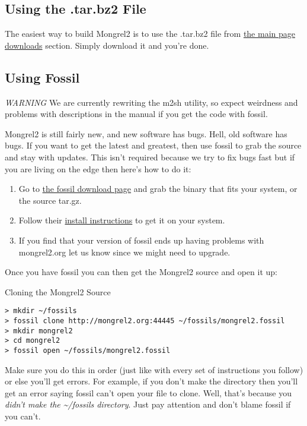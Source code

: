 \subsection{Using the .tar.bz2 File}

The easiest way to build Mongrel2 is to use the .tar.bz2 file from 
\href{http://mongrel2.org/home#download}{the main page downloads} section.
Simply download it and you're done.


\subsection{Using Fossil}

\emph{WARNING} We are currently rewriting the m2sh utility, so expect weirdness
and problems with descriptions in the manual if you get the code with fossil.

Mongrel2 is still fairly new, and new software has bugs.  Hell, old software has bugs.
If you want to get the latest and greatest, then use fossil to grab the source and stay
with updates.  This isn't required because we try to fix bugs fast but if you are
living on the edge then here's how to do it:

\begin{enumerate}
\item Go to \href{http://www.fossil-scm.org/download.html}{the fossil download page} and
    grab the binary that fits your system, or the source tar.gz.
\item Follow their \href{http://fossil-scm.org/index.html/doc/tip/www/build.wiki}{install instructions}
    to get it on your system.
\item If you find that your version of fossil ends up having problems with mongrel2.org let us know since
    we might need to upgrade.
\end{enumerate}

Once you have fossil you can then get the Mongrel2 source and open it up:

\begin{code}{Cloning the Mongrel2 Source}
\begin{lstlisting}
> mkdir ~/fossils
> fossil clone http://mongrel2.org:44445 ~/fossils/mongrel2.fossil
> mkdir mongrel2
> cd mongrel2
> fossil open ~/fossils/mongrel2.fossil
\end{lstlisting}
\end{code}

Make sure you do this in order (just like with every set of instructions you follow)
or else you'll get errors.  For example, if you don't make the  directory
then you'll get an error saying fossil can't open your file to clone.  Well, that's because
you \emph{didn't make the \~{}/fossils directory}.  Just pay attention and don't blame fossil
if you can't.




